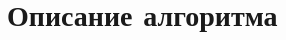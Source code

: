 \documentclass[hyperref=unicode, aspectratio=169]{beamer}
\begin{document}
\section{Описание алгоритма}
\end{document}
